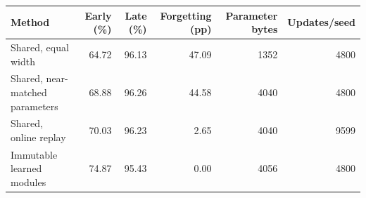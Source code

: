 \begin{tabular}{@{}lrrrrr@{}}
\toprule
Method & Early (\%) & Late (\%) & Forgetting (pp) & Parameter bytes & Updates/seed \\
\midrule
Shared, equal width & 64.72 & 96.13 & 47.09 & 1352 & 4800 \\
Shared, near-matched parameters & 68.88 & 96.26 & 44.58 & 4040 & 4800 \\
Shared, online replay & 70.03 & 96.23 & 2.65 & 4040 & 9599 \\
Immutable learned modules & 74.87 & 95.43 & 0.00 & 4056 & 4800 \\
\bottomrule
\end{tabular}
